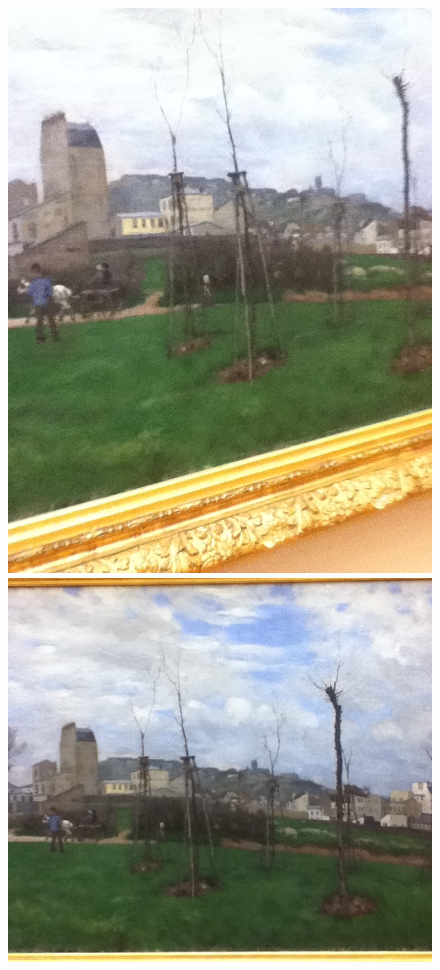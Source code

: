 \begin{figure}
  \begin{minipage}[c]{.33\linewidth}
    \centering
    \includegraphics[width=\textwidth, angle=270]{figures/23D-0740.JPG}
  \end{minipage} \hfill
  \begin{minipage}[c]{.33\linewidth}
    \centering
    \includegraphics[width=\textwidth]{figures/23D-2.JPG}

\end{minipage}
\end{figure}
